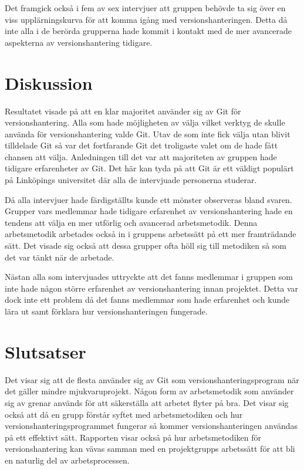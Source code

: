 Det framgick också i fem av sex intervjuer att gruppen behövde ta sig över en viss upplärningskurva för att komma igång med versionshanteringen. Detta då inte alla i de berörda grupperna hade kommit i kontakt med de mer avancerade aspekterna av versionshantering tidigare.

\section{Diskussion}

Resultatet visade på att en klar majoritet använder sig av Git för versionshantering. Alla som hade möjligheten av välja vilket verktyg de skulle använda för versionshantering valde Git. Utav de som inte fick välja utan blivit tilldelade Git så var det fortfarande Git det troligaste valet om de hade fått chansen att välja. Anledningen till det var att majoriteten av gruppen hade tidigare erfarenheter av Git. Det här kan tyda på att Git är ett väldigt populärt på Linköpings universitet där alla de intervjuade personerna studerar.

Då alla intervjuer hade färdigställts kunde ett mönster observeras bland svaren. Grupper vars medlemmar hade tidigare erfarenhet av versionshantering hade en tendens att välja en mer utförlig och avancerad arbetsmetodik. Denna arbetsmetodik arbetades också in i gruppens arbetssätt på ett mer framträdande sätt. Det visade sig också att dessa grupper ofta höll sig till metodiken så som det var tänkt när de arbetade.

Nästan alla som intervjuades uttryckte att det fanns medlemmar i gruppen som inte hade någon större erfarenhet av versionshantering innan projektet. Detta var dock inte ett problem då det fanns medlemmar som hade erfarenhet och kunde lära ut samt förklara hur versionshanteringen fungerade.

\section{Slutsatser}

Det visar sig att de flesta använder sig av Git som versionshanteringsprogram när det gäller mindre mjukvaruprojekt. Någon form av arbetsmetodik som använder sig av grenar används för att säkerställa att arbetet flyter på bra. Det visar sig också att då en grupp förstår syftet med arbetsmetodiken och hur versionshanteringsprogrammet fungerar så kommer versionshanteringen användas på ett effektivt sätt. Rapporten visar också på hur arbetsmetodiken för versionshantering kan vävas samman med en projektgrupps arbetssätt för att bli en naturlig del av arbetsprocessen.
